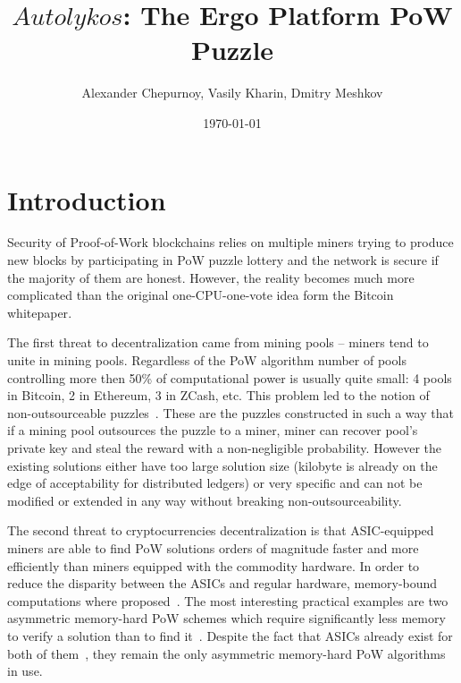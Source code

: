 \documentclass[]{article}
\newcommand{\Name}{$Autolykos$}
\begin{document}
    \title{\Name: The Ergo Platform PoW Puzzle}

    \author{Alexander Chepurnoy, Vasily Kharin, Dmitry Meshkov}

    \date{\today}
    \maketitle



    \section{Introduction}

    Security of Proof-of-Work blockchains relies 
    on multiple miners trying to produce new blocks by
    participating in PoW puzzle lottery and the network is secure if the
    majority of them are honest. However, the reality becomes much more complicated
    than the original one-CPU-one-vote idea form the Bitcoin whitepaper\cite{nakamoto2008bitcoin}.

    The first threat to decentralization came from mining pools -- miners tend
    to unite in mining pools.
    Regardless of the PoW algorithm number of pools controlling more then 50\% of
    computational power is usually quite small: 4 pools in Bitcoin, 2 in Ethereum, 3 in ZCash, etc.
    This problem led to the notion of non-outsourceable puzzles~\cite{miller2015nonoutsourceable,daian2017piecework}.
    These are the puzzles constructed in such a way that if a mining pool outsources the puzzle
    to a miner, miner can recover pool's private key and steal the reward with a non-negligible probability.
    However the existing solutions either have too large solution size (kilobyte is already
    on the edge of acceptability for distributed ledgers) or very specific and
    can not be modified or extended in any way without breaking non-outsourceability.

    The second threat to cryptocurrencies decentralization is that ASIC-equipped miners are
    able to find PoW solutions orders of magnitude faster and more efficiently
    than miners equipped with the commodity hardware. In order to reduce the
    disparity between the ASICs and regular hardware, memory-bound computations
    where proposed~\cite{dwork2003memory}. The most interesting practical
    examples are two
    asymmetric memory-hard PoW schemes which require significantly less memory
    to verify a solution than to find it~\cite{biryukov2017equihash,ethHash}.
    Despite the fact that ASICs already exist for both of them~\cite{ETHAsics,EquihashAsics},
    they remain the only asymmetric memory-hard PoW algorithms in use.
\end{document}
